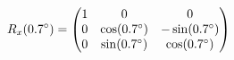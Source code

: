 \documentclass[preview]{standalone}
\begin{document}
\begin{align*}
\special{dvisvgm:raw <g id='unique000'>}R_x(0.7^\circ) = \begin{pmatrix} 1 & 0 & 0 \\ 0 & \cos(0.7^\circ) & -\sin(0.7^\circ) \\ 0 & \sin(0.7^\circ) & \cos(0.7^\circ) \end{pmatrix}\special{dvisvgm:raw </g>}
\end{align*}
\end{document}
